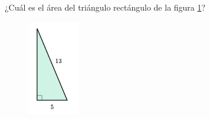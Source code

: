 \question[15]  ¿Cuál es el área del triángulo rectángulo de la figura \ref{fig:area_rectangulo_03}?
\begin{figure}[H]
    \begin{center}
        \includegraphics[width=0.2\textwidth]{../images/area_rectangulo_03.png}
    \end{center}
    \caption{}
    \label{fig:area_rectangulo_03}
\end{figure}